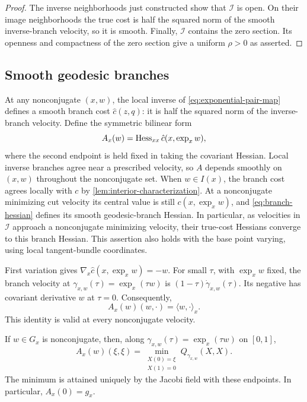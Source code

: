 \begin{proof}
The inverse neighborhoods just constructed show that $\mathcal I$ is
open.  On their image neighborhoods the true cost is half the squared
norm of the smooth inverse-branch velocity, so it is smooth.
Finally, $\mathcal I$ contains the zero section.  Its openness and
compactness of the zero section give a uniform $\rho>0$ as asserted.
\end{proof}

\subsection{Smooth geodesic branches}

At any nonconjugate $(x,w)$, the local inverse of
\eqref{eq:exponential-pair-map} defines a smooth branch cost
$\hat c(z,q)$: it is half the squared norm of the inverse-branch
velocity.  Define the symmetric bilinear form
\begin{equation}
 A_x(w)=\operatorname{Hess}_{xx}\hat c(x,\exp_x w),
 \label{eq:branch-hessian}
\end{equation}
where the second endpoint is held fixed in taking the covariant
Hessian.  Local inverse branches agree near a prescribed velocity,
so $A$ depends smoothly on $(x,w)$ throughout the nonconjugate set.
When $w\in I(x)$, the branch cost agrees locally with $c$ by
\cref{lem:interior-characterization}.  At a nonconjugate minimizing
cut velocity its central value is still $c(x,\exp_x w)$, and
\eqref{eq:branch-hessian} defines its smooth geodesic-branch Hessian.
In particular, as velocities in $\mathcal I$ approach a nonconjugate
minimizing velocity, their true-cost Hessians converge to this branch
Hessian.  This assertion also holds with the base point varying, using
local tangent-bundle coordinates.

First variation gives $\nabla_x\hat c(x,\exp_x w)=-w$.
For small $\tau$, with $\exp_x w$ fixed, the branch velocity at
$\gamma_{x,w}(\tau)=\exp_x(\tau w)$ is
$(1-\tau)\dot\gamma_{x,w}(\tau)$.  Its negative has covariant
derivative $w$ at $\tau=0$.  Consequently,
\begin{equation}
 A_x(w)(w,\cdot)=\langle w,\cdot\rangle_x.
 \label{eq:radial-hessian}
\end{equation}
This identity is valid at every nonconjugate velocity.

\begin{lemma}
\label{lem:hessian-index}
If $w\in G_x$ is nonconjugate, then, along
$\gamma_{x,w}(\tau)=\exp_x(\tau w)$ on $[0,1]$,
\begin{equation}
 A_x(w)(\xi,\xi)
 =\min_{\substack{X(0)=\xi\\X(1)=0}} Q_{\gamma_{x,w}}(X,X).
 \label{eq:hessian-index-minimum}
\end{equation}
The minimum is attained uniquely by the Jacobi field with these
endpoints.  In particular, $A_x(0)=g_x$.
\end{lemma}

